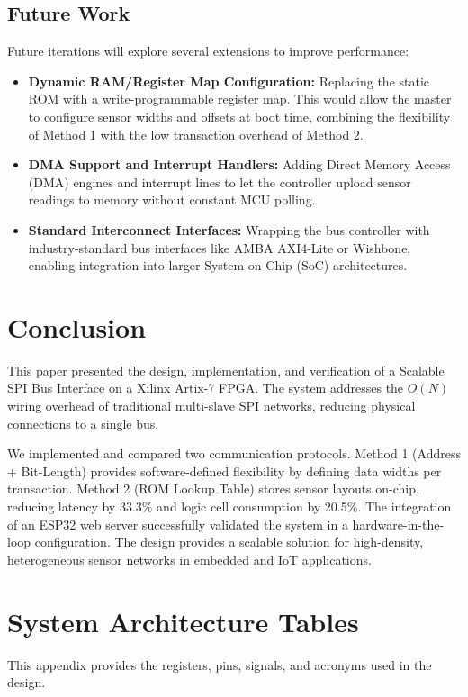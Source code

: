 \documentclass[conference]{IEEEtran}
\begin{document}
\subsection{Future Work}
Future iterations will explore several extensions to improve performance:
\begin{itemize}
    \item \textbf{Dynamic RAM/Register Map Configuration:} Replacing the static ROM with a write-programmable register map. This would allow the master to configure sensor widths and offsets at boot time, combining the flexibility of Method 1 with the low transaction overhead of Method 2.
    \item \textbf{DMA Support and Interrupt Handlers:} Adding Direct Memory Access (DMA) engines and interrupt lines to let the controller upload sensor readings to memory without constant MCU polling.
    \item \textbf{Standard Interconnect Interfaces:} Wrapping the bus controller with industry-standard bus interfaces like AMBA AXI4-Lite or Wishbone, enabling integration into larger System-on-Chip (SoC) architectures.
\end{itemize}

\section{Conclusion}
This paper presented the design, implementation, and verification of a Scalable SPI Bus Interface on a Xilinx Artix-7 FPGA. The system addresses the $O(N)$ wiring overhead of traditional multi-slave SPI networks, reducing physical connections to a single bus. 

We implemented and compared two communication protocols. Method 1 (Address + Bit-Length) provides software-defined flexibility by defining data widths per transaction. Method 2 (ROM Lookup Table) stores sensor layouts on-chip, reducing latency by 33.3\% and logic cell consumption by 20.5\%. The integration of an ESP32 web server successfully validated the system in a hardware-in-the-loop configuration. The design provides a scalable solution for high-density, heterogeneous sensor networks in embedded and IoT applications.

\appendices

\section{System Architecture Tables}
This appendix provides the registers, pins, signals, and acronyms used in the design.
\end{document}
